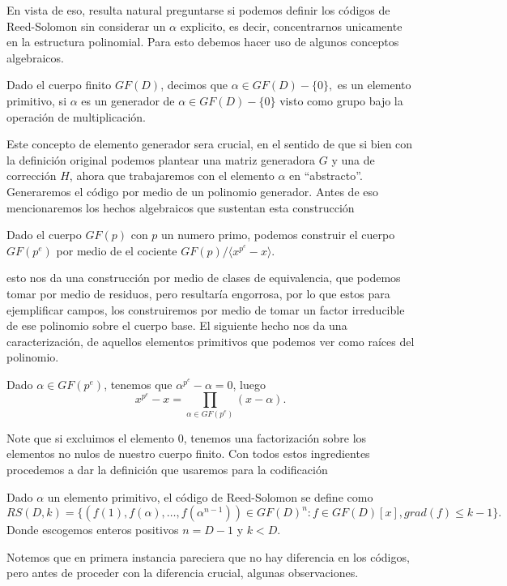 En vista de eso, resulta natural preguntarse si podemos definir los códigos de Reed-Solomon sin considerar un $\alpha$ explicito, es decir, concentrarnos unicamente en la estructura polinomial. Para esto debemos hacer uso de algunos conceptos algebraicos.

\begin{definition}
    Dado el cuerpo finito $GF(D)$, decimos que $\alpha\in GF(D)-\{0\},$ es un elemento primitivo, si $\alpha$ es un generador de $\alpha\in GF(D)-\{0\}$ visto como grupo bajo la operación de multiplicación.  
\end{definition}

Este concepto de elemento generador sera crucial, en el sentido de que si bien con la definición original podemos plantear una matriz generadora $G$ y una de corrección $H$, ahora que trabajaremos con el elemento $\alpha$ en ``abstracto''. Generaremos el código por medio de un polinomio generador. Antes de eso mencionaremos los hechos algebraicos que sustentan esta construcción
\begin{prop}
    Dado el cuerpo $GF(p)$ con $p$ un numero primo, podemos construir el cuerpo $GF(p^e)$ por medio de el cociente $GF(p)/\langle x^{p^e}-x\rangle$.
\end{prop}
esto nos da una construcción por medio de clases de equivalencia, que podemos tomar por medio de residuos, pero resultaría engorrosa, por lo que estos para ejemplificar campos, los construiremos por medio de tomar un factor irreducible de ese polinomio sobre el cuerpo base. El siguiente hecho nos da una caracterización, de aquellos elementos primitivos que podemos ver como raíces del polinomio.
\begin{prop}
    Dado $\alpha\in GF(p^e)$, tenemos que $\alpha^{p^e}-\alpha=0$, luego 
    $$x^{p^e}-x=\prod_{\alpha\in GF(p^e) }(x-\alpha).$$
\end{prop}
Note que si excluimos el elemento $0$, tenemos una factorización sobre los elementos no nulos de nuestro cuerpo finito. Con todos estos ingredientes procedemos a dar la definición que usaremos para la codificación
\begin{definition}
  Dado $\alpha$ un elemento primitivo, el código de Reed-Solomon se define como
  $$RS(D,k)=\{(f(1),f(\alpha),\ldots,f(\alpha^{n-1}))\in GF(D)^n:f\in GF(D)[x], grad(f)\leq k-1\}.$$
  Donde escogemos enteros positivos $n=D-1$ y $k<D.$
\end{definition}
Notemos que en primera instancia pareciera que no hay diferencia en los códigos, pero antes de proceder con la diferencia crucial, algunas observaciones.
